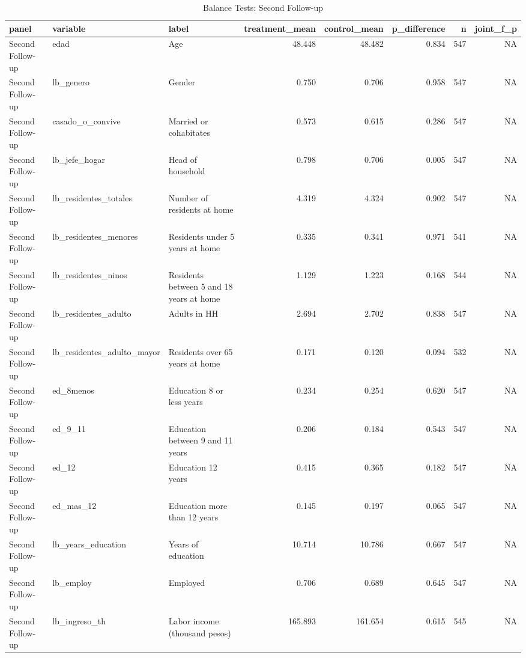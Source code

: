 \begin{table}

\caption{Balance Tests: Second Follow-up}
\centering
\begin{tabular}[t]{lllrrrrr}
\toprule
panel & variable & label & treatment\_mean & control\_mean & p\_difference & n & joint\_f\_p\\
\midrule
Second Follow-up & edad & Age & 48.448 & 48.482 & 0.834 & 547 & NA\\
Second Follow-up & lb\_genero & Gender & 0.750 & 0.706 & 0.958 & 547 & NA\\
Second Follow-up & casado\_o\_convive & Married or cohabitates & 0.573 & 0.615 & 0.286 & 547 & NA\\
Second Follow-up & lb\_jefe\_hogar & Head of household & 0.798 & 0.706 & 0.005 & 547 & NA\\
Second Follow-up & lb\_residentes\_totales & Number of residents at home & 4.319 & 4.324 & 0.902 & 547 & NA\\
\addlinespace
Second Follow-up & lb\_residentes\_menores & Residents under 5 years at home & 0.335 & 0.341 & 0.971 & 541 & NA\\
Second Follow-up & lb\_residentes\_ninos & Residents between 5 and 18 years at home & 1.129 & 1.223 & 0.168 & 544 & NA\\
Second Follow-up & lb\_residentes\_adulto & Adults in HH & 2.694 & 2.702 & 0.838 & 547 & NA\\
Second Follow-up & lb\_residentes\_adulto\_mayor & Residents over 65 years at home & 0.171 & 0.120 & 0.094 & 532 & NA\\
Second Follow-up & ed\_8menos & Education 8 or less years & 0.234 & 0.254 & 0.620 & 547 & NA\\
\addlinespace
Second Follow-up & ed\_9\_11 & Education between 9 and 11 years & 0.206 & 0.184 & 0.543 & 547 & NA\\
Second Follow-up & ed\_12 & Education 12 years & 0.415 & 0.365 & 0.182 & 547 & NA\\
Second Follow-up & ed\_mas\_12 & Education more than 12 years & 0.145 & 0.197 & 0.065 & 547 & NA\\
Second Follow-up & lb\_years\_education & Years of education & 10.714 & 10.786 & 0.667 & 547 & NA\\
Second Follow-up & lb\_employ & Employed & 0.706 & 0.689 & 0.645 & 547 & NA\\
\addlinespace
Second Follow-up & lb\_ingreso\_th & Labor income (thousand pesos) & 165.893 & 161.654 & 0.615 & 545 & NA\\

\end{tabular}
\end{table}
